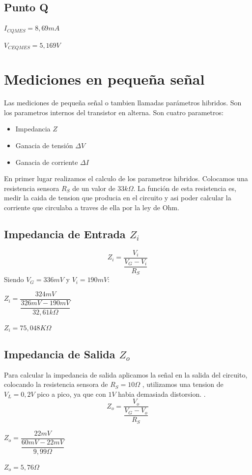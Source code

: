 \documentclass[12pt]{article}
\begin{document}
\begin{center}

\subsection{Punto Q}
    
  $I_{CQMES}=8,69mA$

  $V_{CEQMES}=5,169V$
\end{center}


\section{Mediciones en pequeña señal}
Las mediciones de pequeña señal o tambien llamadas parámetros hibridos.
Son los parametros internos del transistor en alterna. Son cuatro parametros:

\begin{itemize}
\item Impedancia $Z$
\item Ganacia de tensión $\Delta V$
\item Ganacia de corriente $\Delta I$
\end{itemize}
En primer lugar realizamos el calculo de los parametros hibridos.
Colocamos una resistencia sensora $R_S$ de un valor de $33 k\Omega$. La función de esta resistencia es, medir la caida de tension que producia en el circuito y asi poder calcular la corriente que circulaba a traves de ella por la ley de Ohm.

\subsection{Impedancia de Entrada $Z_i$}
\begin{equation}
 Z_i=\dfrac{V_i}{\dfrac{V_G-V_i}{R_S}}
\end{equation}
Siendo $V_G=336mV$ y $V_i=190mV$:
\begin{center}
 $Z_i=\dfrac{324mV}{\dfrac{326mV-190mV}{32,61k\Omega}}$
 
 $Z_i=75,048K\Omega$
\end{center}

\subsection{Impedancia de Salida $Z_o$}
Para calcular la impedancia de salida aplicamos la señal en la salida del circuito, colocando la resistencia sensora de $R_S=10 \Omega$ , utilizamos una tension de $V_L=0,2V$ pico a pico, ya que con $1V$ habia demasiada distorsion.  .
\begin{equation}
 Z_o=\dfrac{V_o}{\dfrac{V_G-V_o}{R_S}}
\end{equation}
\begin{center}
 $Z_o=\dfrac{22mV}{\dfrac{60mV-22mV}{9,99\Omega}}$
 
 $Z_o=5,76\Omega$
\end{center}
\end{document}
